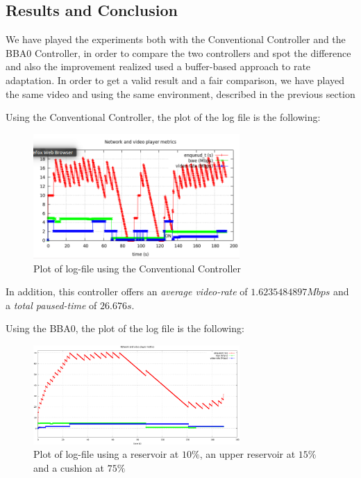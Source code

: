 \documentclass[a4paper]{report}
\begin{document}
\subsection{Results and Conclusion}

We have played the experiments both with the Conventional Controller and the BBA0 Controller, in order to compare the two controllers and spot the difference and also the improvement realized used a buffer-based approach to rate adaptation.
In order to get a valid result and a fair comparison, we have played the same video and using the same environment, described in the previous section

Using the Conventional Controller, the plot of the log file is the following:

\begin{figure}[H]
  \begin{center}
    \includegraphics[width=0.7\textwidth]{conventionalcontroller}
  \end{center}
  \caption{Plot of log-file using the Conventional Controller}\label{conventional}
\end{figure}

In addition, this controller offers an \textit{average video-rate} of $1.6235484897 Mbps$ and a \textit{total paused-time} of $26.676 s$.


Using the BBA0, the plot of the log file is the following:

\begin{figure}[H]
  \begin{center}
    \includegraphics[width=0.7\textwidth]{res_ten_cushion_seventyfive}
  \end{center}
  \caption{Plot of log-file using a reservoir at $10\%$, an upper reservoir at $15\%$ and a cushion at $75\%$}\label{bba0-1}
\end{figure}
\end{document}
